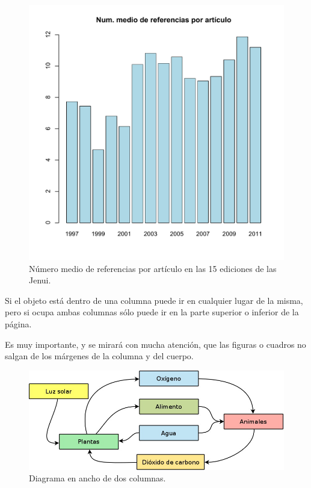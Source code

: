 \documentclass[twocolumn,twoside,a4paper, 10pt]{article}
\begin{document}
\begin{figure}
\begin{center}
	\includegraphics[width = \linewidth]{mediaref.pdf}
\end{center}

\vspace{-6ex}
	\caption{\label{fig:medias} Número medio de referencias por 
	artículo en las 15 ediciones de las Jenui.}
\end{figure}

Si el objeto está dentro de una columna puede ir en cualquier lugar 
de la misma, pero si ocupa ambas columnas sólo puede ir en la parte 
superior o inferior de la página.

Es muy importante, y se mirará con mucha atención, que las figuras o 
cuadros no salgan de los márgenes de la columna y del cuerpo.
\begin{figure}
	\begin{center}
	\includegraphics[width = 0.8\linewidth]{diagrLargo.jpg}
	\end{center}
	\caption{Diagrama en ancho de dos columnas.}
\end{figure}
\end{document}
